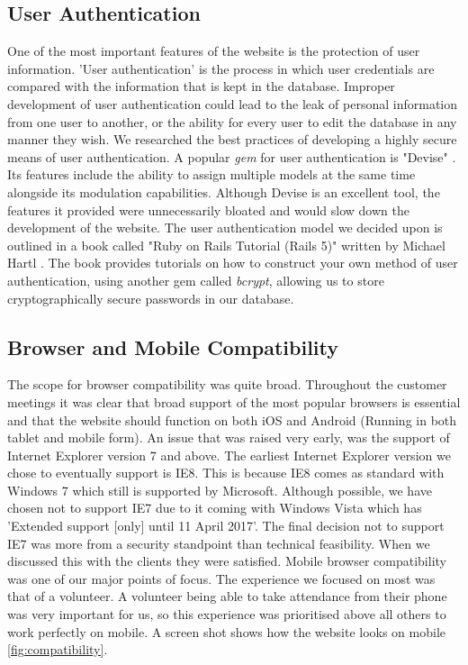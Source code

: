 \documentclass{l3proj}
\begin{document}
\subsection{User Authentication}
\label{sec:authentication}

One of the most important features of the website is the protection of user information. 'User authentication' \cite{authentication} is the process in which user credentials are compared with the information that is kept in the database. Improper development of user authentication could lead to the leak of personal information from one user to another, or the ability for every user to edit the database in any manner they wish. We researched the best practices of developing a highly secure means of user authentication. A popular \textit{gem} for user authentication is "Devise" \cite{devise}. Its features include the ability to assign multiple models at the same time alongside its modulation capabilities. Although Devise is an excellent tool, the features it provided were unnecessarily bloated and would slow down the development of the website. The user authentication model we decided upon is outlined in a book called "Ruby on Rails Tutorial (Rails 5)" written by Michael Hartl \cite{railsTut}. The book provides tutorials on how to construct your own method of user authentication, using another gem called \textit{bcrypt}, allowing us to store cryptographically secure passwords in our database.

\subsection{Browser and Mobile Compatibility}
\label{sec:compatibility}

The scope for browser compatibility was quite broad. Throughout the customer meetings it was clear that broad support of the most popular browsers is essential and that the website should function on both iOS and Android (Running in both tablet and mobile form).
An issue that was raised very early, was the support of Internet Explorer version 7 and above. The earliest Internet Explorer version we chose to eventually support is IE8. This is because IE8 comes as standard with Windows 7 which still is supported by Microsoft. Although possible, we have chosen not to support IE7 due to it coming with Windows Vista which has 'Extended support [only] until 11 April 2017'. The final decision not to support IE7 was more from a security standpoint than technical feasibility. When we discussed this with the clients they were satisfied. Mobile browser compatibility was one of our major points of focus. The experience we focused on most was that of a volunteer. A volunteer being able to take attendance from their phone was very important for us, so this experience was prioritised above all others to work perfectly on mobile. A screen shot shows how the website looks on mobile \autoref{fig:compatibility}.
\end{document}
